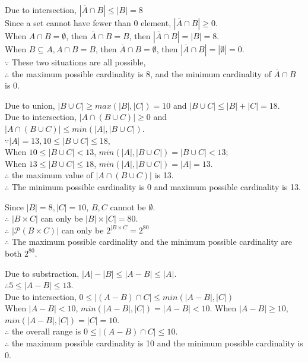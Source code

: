 \documentclass[12pt]{exam}
\begin{document}
\begin{solution}
    \begin{qparts}
        \item 
        Due to intersection, $|\overline{A} \cap B| \leq |B| = 8$\\
        Since a set cannot have fewer than 0 element, $|\overline{A} \cap B| \geq 0$.\\
        When $A \cap B = \emptyset$, then $\overline{A} \cap B = B$, then $|\overline{A} \cap B| = |B| = 8$.\\
        When $B \subseteq A, A \cap B = B$, then $\overline{A} \cap B = \emptyset$, then $|\overline{A} \cap B| = |\emptyset| = 0$.\\
        $\because$ These two situations are all possible, \\
        $\therefore$ the maximum possible cardinality is 8, and the minimum cardinality of $\overline{A} \cap B$ is 0.
        \item 
        Due to union, $|B \cup C| \geq max(|B|,|C|) = 10$ and $|B \cup C| \leq |B| + |C| = 18$.\\
        Due to intersection, $|A \cap (B \cup C)| \geq 0$ and $|A \cap (B \cup C)| \leq min(|A|, |B \cup C|)$.\\
        $\because |A| = 13, 10 \leq |B \cup C| \leq 18$,\\
        When $10 \leq |B \cup C| < 13$, $min(|A|,|B \cup C|) = |B \cup C| < 13$;\\
        When $13 \leq |B \cup C| \leq 18$,  $min(|A|,|B \cup C|) = |A| = 13$.\\
        $\therefore$ the maximum value of $|A \cap (B \cup C)|$ is 13.\\
        $\therefore$ The minimum possible cardinality is 0 and maximum possible cardinality is 13.
        \item 
        Since $|B| = 8, |C| = 10$, $B,C$ cannot be $\emptyset$. \\
        $\therefore$ $|B \times C|$ can only be $|B| \times |C| = 80$. 
        \\$\therefore$ $|\mathcal{P}(B \times C)|$ can only be $2^{|B \times C} = 2^80$
        \\$\therefore$ The maximum possible cardinality and the minimum possible cardinality are both $2^{80}$.
        \item 
        Due to substraction, $|A| - |B| \leq |A- B| \leq |A|$.\\
        $\therefore 5 \leq |A-B| \leq 13$.\\
        Due to intersection, $0 \leq |(A-B) \cap C| \leq min(|A-B|, |C|)$\\
        When $|A - B| <10$, $min(|A-B|, |C|) = |A-B| < 10$. When $|A-B| \geq 10$,  $min(|A-B|, |C|) = |C| = 10$. 
        \\$\therefore $ the overall range is $0 \leq |(A-B) \cap C| \leq 10$.
        \\$\therefore$ the maximum possible cardinality is 10 and the minimum possible cardinality is 0.

    \end{qparts}
\end{solution}
\end{document}
